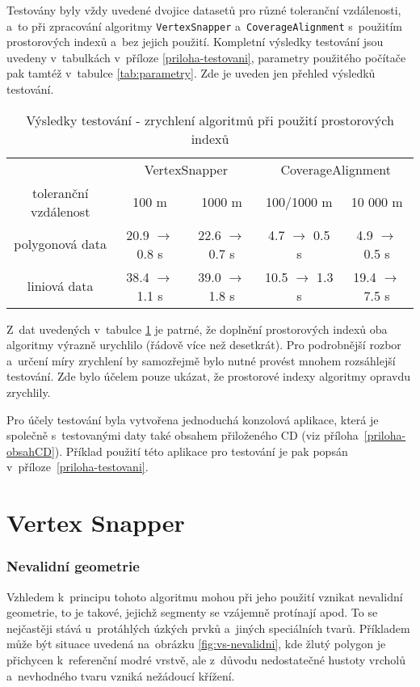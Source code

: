 Testovány byly vždy uvedené dvojice datasetů pro různé toleranční vzdálenosti,
a~to při zpracování algoritmy \texttt{Vertex\-Snapper} a~\texttt{Coverage\-Alignment}
s~použitím prostorových indexů a~bez jejich použití. Kompletní výsledky testování 
jsou uvedeny v~tabulkách v~příloze \ref{priloha-testovani}, parametry použitého 
počítače pak tamtéž v~tabulce \ref{tab:parametry}. Zde je uveden jen přehled 
výsledků testování.

\begin{table}[H]
 \centering
  \caption[Výsledky testování]{Výsledky testování - zrychlení algoritmů 
	  při použití prostorových indexů}
\begin{tabular}{|c|cc|cc|}
\hline
  & \multicolumn{2}{|c}{VertexSnapper} & \multicolumn{2}{|c|}{CoverageAlignment} \\
 toleranční vzdálenost & 100 m & 1000 m & 100/1000 m & 10 000 m \\
\hline
\hline
 polygonová data & 20.9 $\rightarrow$ 0.8 s& 22.6 $\rightarrow$ 0.7 s& 
  4.7 $\rightarrow$ 0.5 s& 4.9 $\rightarrow$ 0.5 s\\
 liniová data & 38.4 $\rightarrow$ 1.1 s& 39.0 $\rightarrow$ 1.8 s& 
  10.5 $\rightarrow$ 1.3 s& 19.4 $\rightarrow$ 7.5 s\\
\hline
\end{tabular}
  \label{tab:vysledky}
\end{table}


Z~dat uvedených v~tabulce \ref{tab:vysledky} je patrné, že doplnění 
prostorových indexů oba algoritmy výrazně urychlilo (řádově více než 
desetkrát). Pro podrobnější rozbor a~určení míry zrychlení by 
samozřejmě bylo nutné provést mnohem rozsáhlejší tes\-tování. Zde bylo 
účelem pouze ukázat, že prostorové indexy algoritmy opravdu zrychlily.

Pro účely testování byla vytvořena jednoduchá konzolová aplikace, která je
spo\-lečně s~testovanými daty také obsahem přiloženého CD (viz 
příloha~\ref{priloha-obsahCD}). Příklad použití této aplikace pro testování je
pak popsán v~příloze~\ref{priloha-testovani}.

\section{Vertex Snapper}
\label{problemy-vs}

\subsubsection{Nevalidní geometrie}
Vzhledem k~principu tohoto algoritmu mohou při jeho použití vznikat nevalidní 
geometrie, to je takové, jejichž segmenty se vzájemně protínají apod. 
To se nejčastěji stává u~protáhlých úzkých prvků a~jiných speciálních tvarů. 
Příkladem může být situace uvedená na~obrázku \ref{fig:vs-nevalidni}, 
kde žlutý polygon je přichycen k~referenční modré vrstvě, ale z~důvodu 
nedostatečné hustoty vrcholů a~nevhodného tvaru vzniká nežádoucí křížení.

